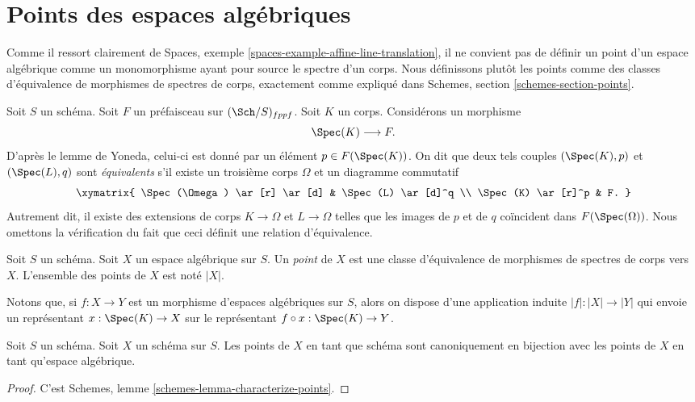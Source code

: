 \section{Points des espaces algébriques}
\label{section-points}

\noindent
Comme il ressort clairement de
Spaces, exemple \ref{spaces-example-affine-line-translation},
il ne convient pas de définir un point d'un espace algébrique comme un monomorphisme
ayant pour source le spectre d'un corps.
Nous définissons plutôt les points comme des classes d'équivalence de morphismes de spectres
de corps, exactement comme expliqué dans
Schemes, section \ref{schemes-section-points}.

\medskip\noindent
Soit $S$ un schéma.
Soit $F$ un préfaisceau sur $(\Sch/S)_{fppf}$.
Soit $K$ un corps. Considérons un morphisme
$$
\Spec(K) \longrightarrow F.
$$
D'après le lemme de Yoneda, celui-ci est donné par un
élément $p \in F(\Spec(K))$. On dit que deux tels
couples $(\Spec(K), p)$ et $(\Spec(L), q)$
sont {\it équivalents} s'il existe
un troisième corps $\Omega$ et un diagramme commutatif
$$
\xymatrix{
\Spec(\Omega) \ar[r] \ar[d] &
\Spec(L) \ar[d]^q \\
\Spec(K) \ar[r]^p &
F.
}
$$
Autrement dit, il existe des extensions de corps
$K \to \Omega$ et $L \to \Omega$ telles que
les images de $p$ et de $q$ coïncident dans
$F(\Spec(\Omega))$. Nous omettons la vérification du fait que ceci
définit une relation d'équivalence.

\begin{definition}
\label{definition-points}
Soit $S$ un schéma. Soit $X$ un espace algébrique sur $S$.
Un {\it point} de $X$ est une classe d'équivalence de morphismes
de spectres de corps vers $X$.
L'ensemble des points de $X$ est noté $|X|$.
\end{definition}

\noindent
Notons que, si $f : X \to Y$ est un morphisme d'espaces algébriques
sur $S$, alors on dispose d'une application induite $|f| : |X| \to |Y|$ qui
envoie un représentant $x : \Spec(K) \to X$ sur le représentant
$f \circ x : \Spec(K) \to Y$.

\begin{lemma}
\label{lemma-scheme-points}
Soit $S$ un schéma. Soit $X$ un schéma sur $S$.
Les points de $X$ en tant que schéma sont canoniquement en bijection
avec les points de $X$ en tant qu'espace algébrique.
\end{lemma}

\begin{proof}
C'est Schemes, lemme \ref{schemes-lemma-characterize-points}.
\end{proof}

